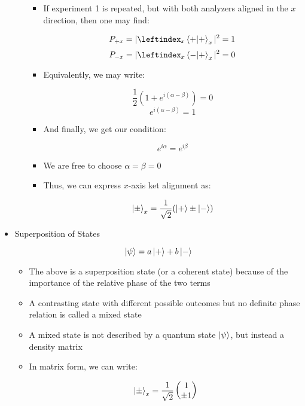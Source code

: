 \begin{itemize}
\begin{itemize}
\begin{itemize}
          \item If experiment 1 is repeated, but with both analyzers aligned in the $x$ direction, then one may find:

            $$P_{+x}=|\leftindex_x\braket{+}_x|^{2}=1$$
            $$P_{-x}=|\leftindex_x\bra{-}\ket{+}_x|^{2}=0$$

          \item Equivalently, we may write:

            $$\frac{1}{2}\left( 1+e^{i(\alpha-\beta)} \right)=0$$
            $$e^{i(\alpha-\beta)}=1$$

          \item And finally, we get our condition:

            $$e^{i\alpha}=e^{i\beta}$$

          \item We are free to choose $\alpha=\beta=0$

          \item Thus, we can express $x$-axis ket alignment as:

            $$\ket{\pm}_x=\frac{1}{\sqrt{2}}(\ket{+}\pm\ket{-})$$

        \end{itemize}

    \end{itemize}

  \item Superposition of States

    $$\ket{\psi}=a\ket{+}+b\ket{-}$$

    \begin{itemize}

      \item The above is a superposition state (or a coherent state) because of the importance of the relative phase of the two terms

      \item A contrasting state with different possible outcomes but no definite phase relation is called a mixed state
      
      \item A mixed state is not described by a quantum state $\ket{\psi}$, but instead a density matrix

      \item In matrix form, we can write:

        $$\ket{\pm}_x=\frac{1}{\sqrt{2}}\left( \begin{matrix} 1\\\pm1\end{matrix} \right)$$


\end{itemize}
\end{itemize}

